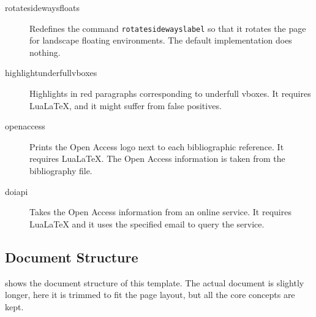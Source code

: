\begin{description}
    \item[rotatesidewaysfloats] Redefines the command \texttt{rotatesidewayslabel} so that it rotates the page for landscape floating environments.
        The default implementation does nothing.
    \item[highlightunderfullvboxes] Highlights in red paragraphs corresponding to underfull vboxes.
        It requires Lua\LaTeX{}, and it might suffer from false positives.
    \item[openaccess] Prints the Open Access logo next to each bibliographic reference.
        It requires Lua\LaTeX{}.
        The Open Access information is taken from the bibliography file.
    \item[doiapi] Takes the Open Access information from an online service.
        It requires Lua\LaTeX{} and it uses the specified email to query the service.
\end{description}


\subsection{Document Structure}

 shows the document structure of this template.
The actual document is slightly longer, here it is trimmed to fit the page layout, but all the core concepts are kept.

